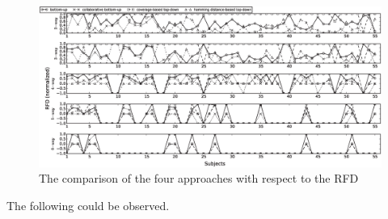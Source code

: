 \documentclass[conference]{IEEEtran}
\theoremstyle{definition}
\begin{document}
\begin{figure}[htbp]
\center
 \includegraphics[width=7.4in]{rfd-degree.eps}
\caption{The comparison of the four approaches with respect to the RFD}
\label{experiement_rfd}
\end{figure}

The following could be observed.
\end{document}
